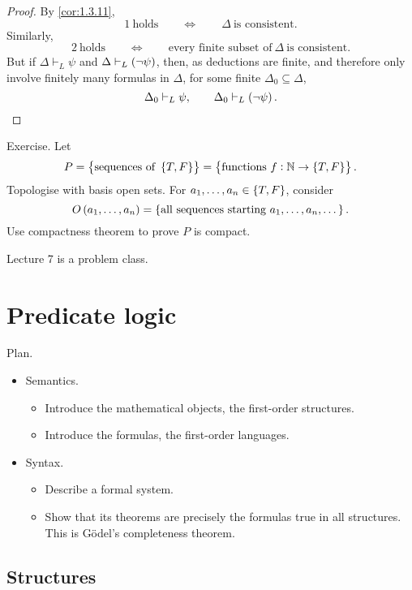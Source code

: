 \begin{proof}
By \ref{cor:1.3.11},
$$ 1 \ \text{holds} \qquad \iff \qquad \Delta \ \text{is consistent}. $$
Similarly,
$$ 2 \ \text{holds} \qquad \iff \qquad \text{every finite subset of} \ \Delta \ \text{is consistent}. $$
But if $ \Delta \vdash_L \psi $ and $ \Delta \vdash_L \notb{\psi} $, then, as deductions are finite, and therefore only involve finitely many formulas in $ \Delta $, for some finite $ \Delta_0 \subseteq \Delta $,
$$ \Delta_0 \vdash_L \psi, \qquad \Delta_0 \vdash_L \notb{\psi}. $$
\end{proof}

\begin{example*}
Exercise. Let
$$ P = \cbr{\text{sequences of} \ \cbr{T, F}} = \cbr{\text{functions} \ f : \N \to \cbr{T, F}}. $$
Topologise with basis open sets. For $ a_1, \dots, a_n \in \cbr{T, F} $, consider
$$ O\br{a_1, \dots, a_n} = \cbr{\text{all sequences starting} \ a_1, \dots, a_n, \dots}. $$
Use compactness theorem to prove $ P $ is compact.
\end{example*}


Lecture 7 is a problem class.

\pagebreak

\section{Predicate logic}


Plan.
\begin{itemize}
\item Semantics.
\begin{itemize}
\item Introduce the mathematical objects, the first-order structures.
\item Introduce the formulas, the first-order languages.
\end{itemize}
\item Syntax.
\begin{itemize}
\item Describe a formal system.
\item Show that its theorems are precisely the formulas true in all structures. This is G\"odel's completeness theorem.
\end{itemize}
\end{itemize}

\subsection{Structures}

